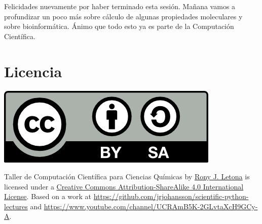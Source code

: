 \documentclass[10pt,letterpaper]{article}
\begin{document}
Felicidades nuevamente por haber terminado esta sesi\'on. Ma\~nana vamos a profundizar un poco m\'as sobre c\'alculo de algunas propiedades moleculares y sobre bioinform\'atica. \'Animo que todo esto ya es parte de la Computaci\'on Cient\'ifica.

\section*{Licencia}

\noindent \includegraphics{img/cc_big.png}

\noindent Taller de Computaci\'on Cient\'ifica para Ciencias Qu\'imicas by \href{http://github.com/zronyj/TQCA}{Rony J. Letona} is licensed under a \href{http://creativecommons.org/licenses/by-sa/4.0/}{Creative Commons Attribution-ShareAlike 4.0 International License}.
Based on a work at \url{https://github.com/jrjohansson/scientific-python-lectures} and \url{https://www.youtube.com/channel/UCRAmB5K-2GLvtaXcH9GCy-A}.
\end{document}
